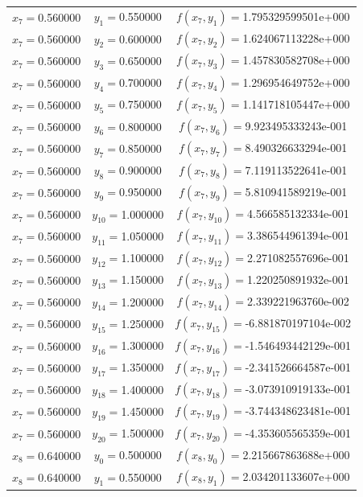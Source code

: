 \begin{longtable}{ccc}
$x_{7}=$0.560000 & $y_{1}=$0.550000 & $f(x_{7},y_{1})=$1.795329599501e+000 \\
$x_{7}=$0.560000 & $y_{2}=$0.600000 & $f(x_{7},y_{2})=$1.624067113228e+000 \\
$x_{7}=$0.560000 & $y_{3}=$0.650000 & $f(x_{7},y_{3})=$1.457830582708e+000 \\
$x_{7}=$0.560000 & $y_{4}=$0.700000 & $f(x_{7},y_{4})=$1.296954649752e+000 \\
$x_{7}=$0.560000 & $y_{5}=$0.750000 & $f(x_{7},y_{5})=$1.141718105447e+000 \\
$x_{7}=$0.560000 & $y_{6}=$0.800000 & $f(x_{7},y_{6})=$9.923495333243e-001 \\
$x_{7}=$0.560000 & $y_{7}=$0.850000 & $f(x_{7},y_{7})=$8.490326633294e-001 \\
$x_{7}=$0.560000 & $y_{8}=$0.900000 & $f(x_{7},y_{8})=$7.119113522641e-001 \\
$x_{7}=$0.560000 & $y_{9}=$0.950000 & $f(x_{7},y_{9})=$5.810941589219e-001 \\
$x_{7}=$0.560000 & $y_{10}=$1.000000 & $f(x_{7},y_{10})=$4.566585132334e-001 \\
$x_{7}=$0.560000 & $y_{11}=$1.050000 & $f(x_{7},y_{11})=$3.386544961394e-001 \\
$x_{7}=$0.560000 & $y_{12}=$1.100000 & $f(x_{7},y_{12})=$2.271082557696e-001 \\
$x_{7}=$0.560000 & $y_{13}=$1.150000 & $f(x_{7},y_{13})=$1.220250891932e-001 \\
$x_{7}=$0.560000 & $y_{14}=$1.200000 & $f(x_{7},y_{14})=$2.339221963760e-002 \\
$x_{7}=$0.560000 & $y_{15}=$1.250000 & $f(x_{7},y_{15})=$-6.881870197104e-002 \\
$x_{7}=$0.560000 & $y_{16}=$1.300000 & $f(x_{7},y_{16})=$-1.546493442129e-001 \\
$x_{7}=$0.560000 & $y_{17}=$1.350000 & $f(x_{7},y_{17})=$-2.341526664587e-001 \\
$x_{7}=$0.560000 & $y_{18}=$1.400000 & $f(x_{7},y_{18})=$-3.073910919133e-001 \\
$x_{7}=$0.560000 & $y_{19}=$1.450000 & $f(x_{7},y_{19})=$-3.744348623481e-001 \\
$x_{7}=$0.560000 & $y_{20}=$1.500000 & $f(x_{7},y_{20})=$-4.353605565359e-001 \\
$x_{8}=$0.640000 & $y_{0}=$0.500000 & $f(x_{8},y_{0})=$2.215667863688e+000 \\
$x_{8}=$0.640000 & $y_{1}=$0.550000 & $f(x_{8},y_{1})=$2.034201133607e+000 \\

\end{longtable}
